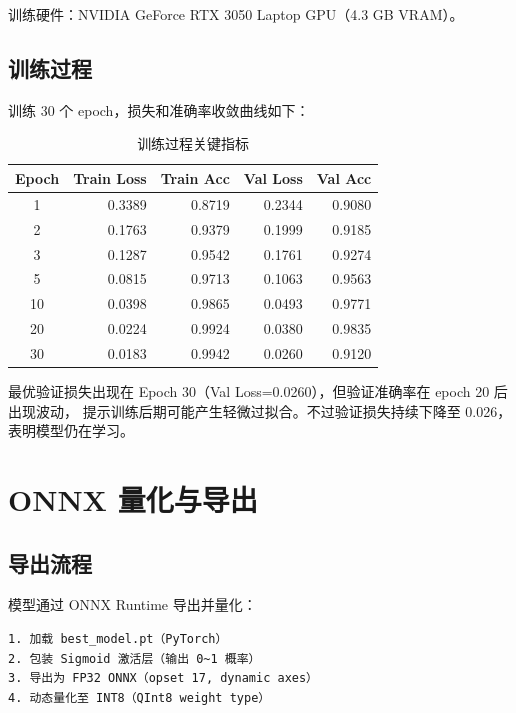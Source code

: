 \documentclass[11pt,a4paper]{article}
\begin{document}
训练硬件：NVIDIA GeForce RTX 3050 Laptop GPU（4.3 GB VRAM）。

\subsection{训练过程}

训练 30 个 epoch，损失和准确率收敛曲线如下：

\begin{table}[H]
\centering
\caption{训练过程关键指标}
\begin{tabular}{crrrr}
\toprule
Epoch & Train Loss & Train Acc & Val Loss & Val Acc \\
\midrule
1 & 0.3389 & 0.8719 & 0.2344 & 0.9080 \\
2 & 0.1763 & 0.9379 & 0.1999 & 0.9185 \\
3 & 0.1287 & 0.9542 & 0.1761 & 0.9274 \\
5 & 0.0815 & 0.9713 & 0.1063 & 0.9563 \\
10 & 0.0398 & 0.9865 & 0.0493 & 0.9771 \\
20 & 0.0224 & 0.9924 & 0.0380 & 0.9835 \\
30 & 0.0183 & 0.9942 & 0.0260 & 0.9120 \\
\bottomrule
\end{tabular}
\end{table}

最优验证损失出现在 Epoch 30（Val Loss=0.0260），但验证准确率在 epoch 20 后出现波动，
提示训练后期可能产生轻微过拟合。不过验证损失持续下降至 0.026，表明模型仍在学习。

\section{ONNX 量化与导出}

\subsection{导出流程}

模型通过 ONNX Runtime 导出并量化：

\begin{Verbatim}[frame=single,fontsize=\small,label=ONNX 导出流程]
1. 加载 best_model.pt（PyTorch）
2. 包装 Sigmoid 激活层（输出 0~1 概率）
3. 导出为 FP32 ONNX（opset 17, dynamic axes）
4. 动态量化至 INT8（QInt8 weight type）
\end{Verbatim}
\end{document}
